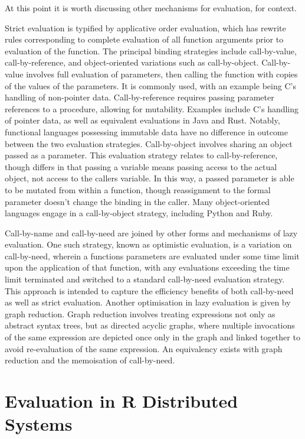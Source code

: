 \documentclass[10pt,a4paper]{article}
\begin{document}
At this point it is worth discussing other mechanisms for evaluation, for context.

Strict evaluation is typified by applicative order evaluation, which has rewrite rules corresponding to complete evaluation of all function arguments prior to evaluation of the function.
The principal binding strategies include call-by-value, call-by-reference, and object-oriented variations such as call-by-object.
Call-by-value involves full evaluation of parameters, then calling the function with copies of the values of the parameters.
It is commonly used, with an example being C's handling of non-pointer data.
Call-by-reference requires passing parameter references to a procedure, allowing for mutability.
Examples include C's handling of pointer data, as well as equivalent evaluations in Java and Rust.
Notably, functional languages possessing immutable data have no difference in outcome between the two evaluation strategies.
Call-by-object involves sharing an object passed as a parameter.
This evaluation strategy relates to call-by-reference, though differs in that passing a variable means passing access to the actual object, not access to the callers variable.
In this way, a passed parameter is able to be mutated from within a function, though reassignment to the formal parameter doesn't change the binding in the caller.
Many object-oriented languages engage in a call-by-object strategy, including Python and Ruby.

Call-by-name and call-by-need are joined by other forms and mechanisms of lazy evaluation.
One such strategy, known as optimistic evaluation, is a variation on call-by-need, wherein a functions parameters are evaluated under some time limit upon the application of that function, with any evaluations exceeding the time limit terminated and switched to a standard call-by-need evaluation strategy.
This approach is intended to capture the efficiency benefits of both call-by-need as well as strict evaluation.
Another optimisation in lazy evaluation is given by graph reduction.
Graph reduction involves treating expressions not only as abstract syntax trees, but as directed acyclic graphs, where multiple invocations of the same expression are depicted once only in the graph and linked together to avoid re-evaluation of the same expression.
An equivalency exists with graph reduction and the memoisation of call-by-need.

\section{Evaluation in R Distributed Systems}\label{sec:rdisteval}
\end{document}
